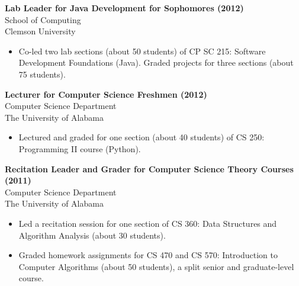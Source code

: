 \textbf{Lab Leader for Java Development for Sophomores (2012)} \\
School of Computing \\
Clemson University

\begin{itemize}
  \item Co-led two lab sections (about 50 students) of CP SC 215: Software
        Development Foundations (Java). Graded projects for three sections (about 75
        students).
\end{itemize}

\textbf{Lecturer for Computer Science Freshmen (2012)} \\
Computer Science Department \\
The University of Alabama

\begin{itemize}
  \item Lectured and graded for one section (about 40 students) of CS 250:
        Programming II course (Python).
\end{itemize}

\textbf{Recitation Leader and Grader for Computer Science Theory Courses (2011)} \\
Computer Science Department \\
The University of Alabama

\begin{itemize}
  \item Led a recitation session for one section of CS 360: Data Structures and
        Algorithm Analysis (about 30 students).
  \item Graded homework assignments for CS 470 and CS 570: Introduction to
        Computer Algorithms (about 50 students), a split senior and
        graduate-level course.
\end{itemize}
